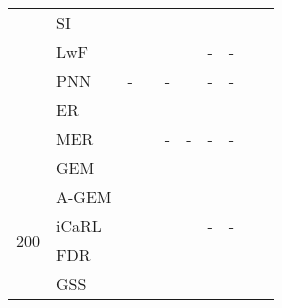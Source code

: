 \documentclass{article}
\newcommand{\xmark}{\textbf{\textendash}}
\begin{document}
\begin{table}[H]
{{\begin{tabular}{clcccccccc}
\multirow{2}{*}{\xmark} & SI                    &   \tiny{}                            &   \tiny{}                         & \tiny{}                       & \tiny{}                         & \tiny{}& \tiny{} \\
                        & LwF                   &   \tiny{}                            &   \tiny{}                         & \tiny{}                       & \tiny{}                         & -                                             & -                        \\
                        & PNN                   & -                                                     &  \tiny{} & -                                              &  \tiny{}& -                                             & -                        \\
\midrule                                                                                
                        & ER                    &   \tiny{}                            &   \tiny{}                         & \tiny{}                       &  \tiny{}                         & \tiny{}                      &  \tiny{} \\
                        & MER                   &   \tiny{}                            &   \tiny{}                         & -                                              & -                                                & -                                             & -                       \\
                        & GEM                   &   \tiny{}                            &   \tiny{}                         & \tiny{}                       &  \tiny{}                         & \tiny{}                      & \tiny{} \\
                        & A-GEM                 &   \tiny{}                            &  \tiny{}& \tiny{}                       & \tiny{}                         & \tiny{}                      & \tiny{} \\
\multirow{2}{*}{200}    & iCaRL                 &   \tiny{}  &   \tiny{}                     & \tiny{}&  \tiny{}& -                                             & -                        \\
                        & FDR                   &   \tiny{}                            &   \tiny{}                         & \tiny{}                       &  \tiny{}                         & \tiny{}                      & \tiny{} \\
                        & GSS                   &   \tiny{}                            &   \tiny{}                         & \tiny{}                       &  \tiny{}                         & \tiny{}                      & \tiny{} \\

\end{tabular}}}
\end{table}
\end{document}

